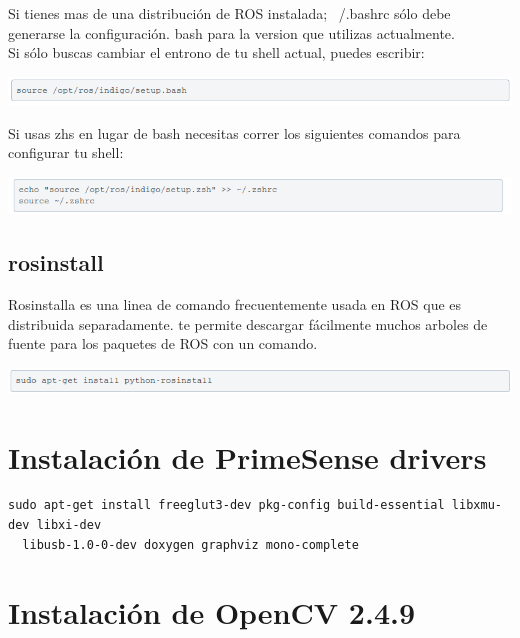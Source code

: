 \documentclass[user_manual.tex]{subfiles}
\begin{document}
Si tienes mas de una distribución de ROS instalada; ~/.bashrc sólo debe generarse la configuración. bash para 
la version que utilizas actualmente.\\

Si sólo buscas cambiar el entrono de tu shell actual, puedes escribir:

\begin{center}
\includegraphics[width=1\textwidth]{Figures/Software/Install_ROS/Paso_15.png}
\end{center}

Si usas zhs en lugar de bash necesitas correr los siguientes comandos para configurar tu shell:

\begin{center}
\includegraphics[width=1\textwidth]{Figures/Software/Install_ROS/Paso_16.png}
\end{center}

\subsection{rosinstall}

Rosinstalla es una linea de comando frecuentemente usada en ROS que es distribuida separadamente. te permite 
descargar fácilmente muchos arboles de fuente para los paquetes de ROS con un comando.

\begin{center}
\includegraphics[width=1\textwidth]{Figures/Software/Install_ROS/Paso_17.png}
\end{center}

\section{Instalación de PrimeSense drivers}

\begin{Verbatim}[fontsize=\footnotesize]
  sudo apt-get install freeglut3-dev pkg-config build-essential libxmu-dev libxi-dev
  libusb-1.0-0-dev doxygen graphviz mono-complete
\end{Verbatim}
\section{Instalación de OpenCV 2.4.9}
\end{document}
